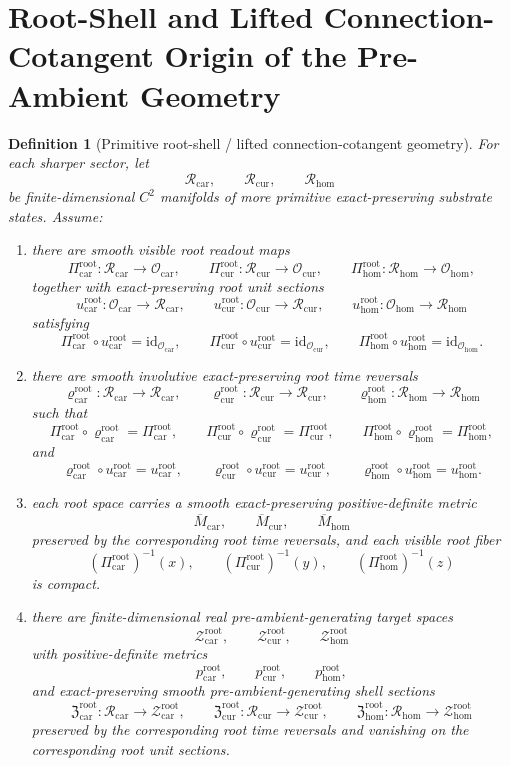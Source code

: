 \documentclass[11pt]{article}
\newcommand{\TensorObjClass}{\mathcal O_{\mathrm{car}}}
\newcommand{\CurObjClass}{\mathcal O_{\mathrm{cur}}}
\newcommand{\HomObjClass}{\mathcal O_{\mathrm{hom}}}
\newcommand{\TensorRootSpace}{\mathcal R_{\mathrm{car}}}
\newcommand{\CurRootSpace}{\mathcal R_{\mathrm{cur}}}
\newcommand{\HomRootSpace}{\mathcal R_{\mathrm{hom}}}
\newcommand{\TensorRootRead}{\Pi_{\mathrm{car}}^{\mathrm{root}}}
\newcommand{\CurRootRead}{\Pi_{\mathrm{cur}}^{\mathrm{root}}}
\newcommand{\HomRootRead}{\Pi_{\mathrm{hom}}^{\mathrm{root}}}
\newcommand{\TensorRootUnit}{u_{\mathrm{car}}^{\mathrm{root}}}
\newcommand{\CurRootUnit}{u_{\mathrm{cur}}^{\mathrm{root}}}
\newcommand{\HomRootUnit}{u_{\mathrm{hom}}^{\mathrm{root}}}
\newcommand{\TensorRootTimeRev}{\varrho_{\mathrm{car}}^{\mathrm{root}}}
\newcommand{\CurRootTimeRev}{\varrho_{\mathrm{cur}}^{\mathrm{root}}}
\newcommand{\HomRootTimeRev}{\varrho_{\mathrm{hom}}^{\mathrm{root}}}
\newcommand{\TensorRootSpaceMetric}{\overline M_{\mathrm{car}}}
\newcommand{\CurRootSpaceMetric}{\overline M_{\mathrm{cur}}}
\newcommand{\HomRootSpaceMetric}{\overline M_{\mathrm{hom}}}
\newcommand{\TensorRootTarget}{\mathcal Z_{\mathrm{car}}^{\mathrm{root}}}
\newcommand{\CurRootTarget}{\mathcal Z_{\mathrm{cur}}^{\mathrm{root}}}
\newcommand{\HomRootTarget}{\mathcal Z_{\mathrm{hom}}^{\mathrm{root}}}
\newcommand{\TensorRootTargetMetric}{p_{\mathrm{car}}^{\mathrm{root}}}
\newcommand{\CurRootTargetMetric}{p_{\mathrm{cur}}^{\mathrm{root}}}
\newcommand{\HomRootTargetMetric}{p_{\mathrm{hom}}^{\mathrm{root}}}
\newcommand{\TensorRootSection}{\mathfrak Z_{\mathrm{car}}^{\mathrm{root}}}
\newcommand{\CurRootSection}{\mathfrak Z_{\mathrm{cur}}^{\mathrm{root}}}
\newcommand{\HomRootSection}{\mathfrak Z_{\mathrm{hom}}^{\mathrm{root}}}
\newtheorem{definition}{Definition}
\begin{document}
\section{Root-Shell and Lifted Connection-Cotangent Origin of the Pre-Ambient Geometry}

\begin{definition}[Primitive root-shell / lifted connection-cotangent geometry]
\label{def:root_geometry}
For each sharper sector, let
\[
\TensorRootSpace,\qquad
\CurRootSpace,\qquad
\HomRootSpace
\]
be finite-dimensional \(C^2\) manifolds of more primitive exact-preserving substrate states. Assume:
\begin{enumerate}
    \item there are smooth visible root readout maps
    \[
    \TensorRootRead:\TensorRootSpace\to\TensorObjClass,\qquad
    \CurRootRead:\CurRootSpace\to\CurObjClass,\qquad
    \HomRootRead:\HomRootSpace\to\HomObjClass,
    \]
    together with exact-preserving root unit sections
    \[
    \TensorRootUnit:\TensorObjClass\to\TensorRootSpace,\qquad
    \CurRootUnit:\CurObjClass\to\CurRootSpace,\qquad
    \HomRootUnit:\HomObjClass\to\HomRootSpace
    \]
    satisfying
    \[
    \TensorRootRead\circ\TensorRootUnit=\mathrm{id}_{\TensorObjClass},\qquad
    \CurRootRead\circ\CurRootUnit=\mathrm{id}_{\CurObjClass},\qquad
    \HomRootRead\circ\HomRootUnit=\mathrm{id}_{\HomObjClass}.
    \]
    \item there are smooth involutive exact-preserving root time reversals
    \[
    \TensorRootTimeRev:\TensorRootSpace\to\TensorRootSpace,\qquad
    \CurRootTimeRev:\CurRootSpace\to\CurRootSpace,\qquad
    \HomRootTimeRev:\HomRootSpace\to\HomRootSpace
    \]
    such that
    \[
    \TensorRootRead\circ\TensorRootTimeRev=\TensorRootRead,\qquad
    \CurRootRead\circ\CurRootTimeRev=\CurRootRead,\qquad
    \HomRootRead\circ\HomRootTimeRev=\HomRootRead,
    \]
    and
    \[
    \TensorRootTimeRev\circ\TensorRootUnit=\TensorRootUnit,\qquad
    \CurRootTimeRev\circ\CurRootUnit=\CurRootUnit,\qquad
    \HomRootTimeRev\circ\HomRootUnit=\HomRootUnit.
    \]
    \item each root space carries a smooth exact-preserving positive-definite metric
    \[
    \TensorRootSpaceMetric,\qquad
    \CurRootSpaceMetric,\qquad
    \HomRootSpaceMetric
    \]
    preserved by the corresponding root time reversals, and each visible root fiber
    \[
    (\TensorRootRead)^{-1}(x),\qquad
    (\CurRootRead)^{-1}(y),\qquad
    (\HomRootRead)^{-1}(z)
    \]
    is compact.
    \item there are finite-dimensional real pre-ambient-generating target spaces
    \[
    \TensorRootTarget,\qquad
    \CurRootTarget,\qquad
    \HomRootTarget
    \]
    with positive-definite metrics
    \[
    \TensorRootTargetMetric,\qquad
    \CurRootTargetMetric,\qquad
    \HomRootTargetMetric,
    \]
    and exact-preserving smooth pre-ambient-generating shell sections
    \[
    \TensorRootSection:\TensorRootSpace\to\TensorRootTarget,\qquad
    \CurRootSection:\CurRootSpace\to\CurRootTarget,\qquad
    \HomRootSection:\HomRootSpace\to\HomRootTarget
    \]
    preserved by the corresponding root time reversals and vanishing on the corresponding root unit sections.


\end{enumerate}
\end{definition}
\end{document}
